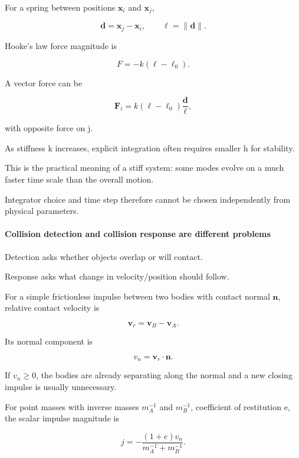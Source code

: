 \hypertarget{03-visual-computing-i-ch001-a-mass-spring-system-exposes-stiffness}{}

For a spring between positions \(\mathbf x_i\) and \(\mathbf x_j\),

\[
\mathbf d=\mathbf x_j-\mathbf x_i,
\qquad
\ell=\|\mathbf d\|.
\]

Hooke's law force magnitude is

\[
F=-k(\ell-\ell_0).
\]

A vector force can be

\[
\mathbf F_i
=
k(\ell-\ell_0)
\frac{\mathbf d}{\ell},
\]

with opposite force on j.

As stiffness k increases, explicit integration often requires smaller h for stability.

This is the practical meaning of a stiff system: some modes evolve on a much faster time scale than the overall motion.

Integrator choice and time step therefore cannot be chosen independently from physical parameters.

\paragraph{Collision detection and collision response are different problems}\label{03-visual-computing-i-ch001-collision-detection-and-collision-response-are-different-problems}

\hypertarget{03-visual-computing-i-ch001-collision-detection-and-collision-response-are-different-problems}{}

Detection asks whether objects overlap or will contact.

Response asks what change in velocity/position should follow.

For a simple frictionless impulse between two bodies with contact normal \(\mathbf n\), relative contact velocity is

\[
\mathbf v_r
=
\mathbf v_B-\mathbf v_A.
\]

Its normal component is

\[
v_n=\mathbf v_r\cdot\mathbf n.
\]

If \(v_n\ge0\), the bodies are already separating along the normal and a new closing impulse is usually unnecessary.

For point masses with inverse masses \(m_A^{-1}\) and \(m_B^{-1}\), coefficient of restitution e, the scalar impulse magnitude is

\[
j
=
-\frac{(1+e)v_n}
{m_A^{-1}+m_B^{-1}}.
\]

